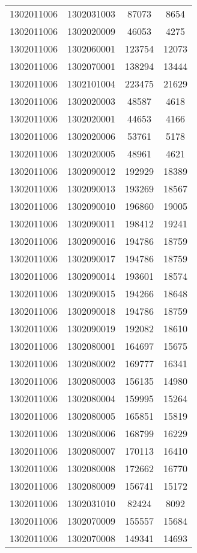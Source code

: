 \begin{longtable}[h]{llcc}
		1302011006 & 1302031003 & 87073 & 8654\\
		1302011006 & 1302020009 & 46053 & 4275\\
		1302011006 & 1302060001 & 123754 & 12073\\
		1302011006 & 1302070001 & 138294 & 13444\\
		1302011006 & 1302101004 & 223475 & 21629\\
		1302011006 & 1302020003 & 48587 & 4618\\
		1302011006 & 1302020001 & 44653 & 4166\\
		1302011006 & 1302020006 & 53761 & 5178\\
		1302011006 & 1302020005 & 48961 & 4621\\
		1302011006 & 1302090012 & 192929 & 18389\\
		1302011006 & 1302090013 & 193269 & 18567\\
		1302011006 & 1302090010 & 196860 & 19005\\
		1302011006 & 1302090011 & 198412 & 19241\\
		1302011006 & 1302090016 & 194786 & 18759\\
		1302011006 & 1302090017 & 194786 & 18759\\
		1302011006 & 1302090014 & 193601 & 18574\\
		1302011006 & 1302090015 & 194266 & 18648\\
		1302011006 & 1302090018 & 194786 & 18759\\
		1302011006 & 1302090019 & 192082 & 18610\\
		1302011006 & 1302080001 & 164697 & 15675\\
		1302011006 & 1302080002 & 169777 & 16341\\
		1302011006 & 1302080003 & 156135 & 14980\\
		1302011006 & 1302080004 & 159995 & 15264\\
		1302011006 & 1302080005 & 165851 & 15819\\
		1302011006 & 1302080006 & 168799 & 16229\\
		1302011006 & 1302080007 & 170113 & 16410\\
		1302011006 & 1302080008 & 172662 & 16770\\
		1302011006 & 1302080009 & 156741 & 15172\\
		1302011006 & 1302031010 & 82424 & 8092\\
		1302011006 & 1302070009 & 155557 & 15684\\
		1302011006 & 1302070008 & 149341 & 14693\\

\end{longtable}
